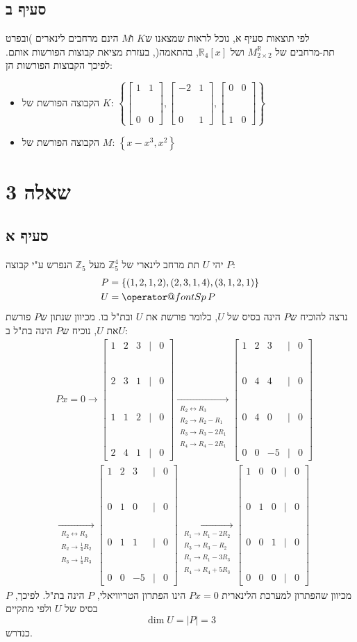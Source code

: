 \documentclass[11pt, oneside]{article}
\makeatletter
\newcommand{\qed}{\R{$\blacksquare$}}
\newcommand{\br}{\\\\\\\\\\\\}
\newcommand{\opr}[1]{\xrightarrow[\text{#1}]{}}
\newcommand{\oprm}[1]{\underset{\substack{#1}}{\longrightarrow}}
\newcommand{\bidiarrow}[1]{\underset{\text{#1}}{\leftrightarrow}}
\newcommand{\mR}{\mathbb{R}}
\newcommand{\mZ}{\mathbb{Z}}
\newcommand{\h}[3]{\R{הגדרה #3#2.#1}}
\newcommand{\Sp}[1]{\mathop{\operator@font Sp}#1}
\newcommand{\tot}[4]{\begin{bmatrix}#1 & #2\br#3 & #4\end{bmatrix}}
\newcommand{\poreset}[2]{\item{הקבוצה הפורשת של $#1$: $#2$}}
\makeatother
\begin{document}
\subsection{סעיף ב}
לפי תוצאות סעיף א, נוכל לראות שמצאנו ש$K$ ו$M$ הינם מרחבים לינארים )ובפרט תת-מרחבים של $M^\mR_{2\times2}$ ושל $\mR_4[x]$, בהתאמה(, בעזרת מציאת קבוצות הפורשות אותם. לפיכך הקבוצות הפורשות הן:
\begin{itemize}
\poreset{K}{\left\{\tot{1}{1}{0}{0}, \tot{-2}{1}{0}{1}, \tot{0}{0}{1}{0}\right\}}
\poreset{M}{\left\{x - x^3, x^2\right\}}
\end{itemize}
\qed
\clearpage

\section{שאלה 3}
\subsection{סעיף א}
יהי $U$ תת מרחב לינארי של $\mZ^4_5$ מעל $\mZ_5$ הנפרש ע"י קבוצה $P$:
\begin{align*}
& P = \left\{(1, 2, 1, 2), (2, 3, 1, 4), (3, 1, 2, 1)\right\}\\
& U = \Sp{P}
\end{align*}
נרצה להוכיח ש$P$ הינה בסיס של $U$, כלומר פורשת את $U$ ובת"ל בו. מכיוון שנתון ש$P$ פורשת את $U$, נוכיח ש$P$ הינה בת"ל ב$U$:
\begin{align*}
& Px = 0 \opr{} \begin{bmatrix}
1 & 2 & 3 & | & 0\br
2 & 3 & 1 & | & 0\br
1 & 1 & 2 & | & 0\br
2 & 4 & 1 & | & 0
\end{bmatrix}
\oprm{%
R_2 \bidiarrow{} R_3\\
R_2 \opr{} R_2 - R_1\\
R_3 \opr{} R_3 - 2R_1\\
R_4 \opr{} R_4 - 2R_1
}
\begin{bmatrix}
1 & 2 & 3 & | & 0\br
0 & 4 & 4 & | & 0\br
0 & 4 & 0 & | & 0\br
0 & 0 & -5 & | & 0
\end{bmatrix}\\
& \oprm{%
R_2 \bidiarrow{} R_3\\
R_2 \opr{} \frac{1}{4} R_2\\
R_3 \opr{} \frac{1}{4} R_3
}
\begin{bmatrix}
1 & 2 & 3 & | & 0\br
0 & 1 & 0 & | & 0\br
0 & 1 & 1 & | & 0\br
0 & 0 & -5 & | & 0
\end{bmatrix}
\oprm{%
R_1 \opr{} R_1 - 2R_2\\
R_3 \opr{} R_3 - R_2\\
R_1 \opr{} R_1 - 3R_3\\
R_4 \opr{} R_4 + 5R_3
}
\begin{bmatrix}
1 & 0 & 0 & | & 0\br
0 & 1 & 0 & | & 0\br
0 & 0 & 1 & | & 0\br
0 & 0 & 0 & | & 0
\end{bmatrix}
\end{align*}
מכיוון שהפתרון למערכת הלינארית $Px = 0$ הינו הפתרון הטריוויאלי, $P$ הינה בת"ל. לפיכך, $P$ בסיס של $U$ ולפי \h{8}{3}{3.} מתקיים
$$\dim{U} = |P| = 3$$
כנדרש.
\br\qed
\end{document}
